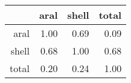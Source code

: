 \begin{table}[ht]
\centering
\begin{tabular}{rrrr}
  \hline
 & aral & shell & total \\ 
  \hline
aral & 1.00 & 0.69 & 0.09 \\ 
  shell & 0.68 & 1.00 & 0.68 \\ 
  total & 0.20 & 0.24 & 1.00 \\ 
   \hline
\end{tabular}
\end{table}
